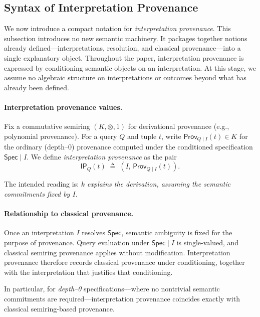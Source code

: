 \documentclass[acmsmall,nonacm]{acmart}
\theoremstyle{remark}
\numberwithin{definition}{section}
\numberwithin{theorem}{section}
\numberwithin{lemma}{section}
\numberwithin{corollary}{section}
\numberwithin{remark}{section}
\numberwithin{example}{section}
\numberwithin{observation}{section}
\numberwithin{assumption}{section}
\newcommand{\Spec}{\mathsf{Spec}}
\newcommand{\Prov}{\mathsf{Prov}}
\begin{document}
\subsection{Syntax of Interpretation Provenance}

We now introduce a compact notation for \emph{interpretation provenance}.
This subsection introduces no new semantic machinery.
It packages together notions already defined—interpretations, resolution, and
classical provenance—into a single explanatory object.
Throughout the paper, interpretation provenance is expressed by conditioning
semantic objects on an interpretation.
At this stage, we assume no algebraic structure on interpretations or outcomes
beyond what has already been defined.

\paragraph{Interpretation provenance values.}
Fix a commutative semiring $(K,\otimes,1)$ for derivational provenance
(e.g., polynomial provenance).
For a query $Q$ and tuple $t$, write $\Prov_{Q \mid I}(t) \in K$ for the
ordinary (depth--0) provenance computed under the conditioned specification
$\Spec \mid I$.
We define \emph{interpretation provenance} as the pair
\[
  \mathsf{IP}_Q(t) \;\triangleq\; (I,\, \Prov_{Q \mid I}(t)).
\]


The intended reading is:
\emph{$k$ explains the derivation, assuming the semantic commitments fixed by $I$.}

\paragraph{Relationship to classical provenance.}
Once an interpretation $I$ resolves $\Spec$, semantic ambiguity is fixed for the purpose of provenance.
Query evaluation under $\Spec \mid I$ is single-valued, and classical semiring
provenance applies without modification.
Interpretation provenance therefore records classical provenance under
conditioning, together with the interpretation that justifies that conditioning.

In particular, for \emph{depth--0} specifications—where no nontrivial semantic
commitments are required—interpretation provenance coincides exactly with
classical semiring-based provenance.
\end{document}

